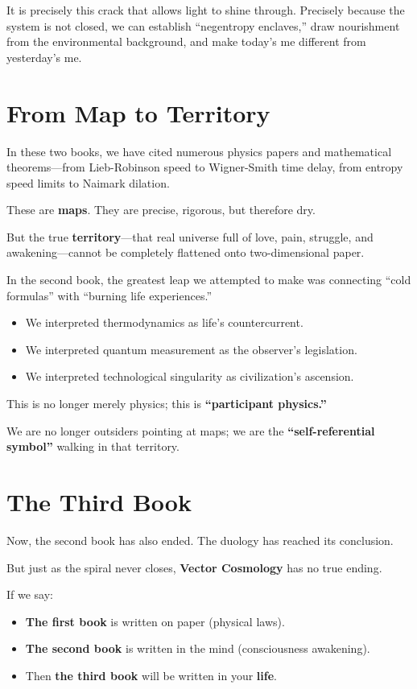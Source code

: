 It is precisely this crack that allows light to shine through. Precisely because the system is not closed, we can establish ``negentropy enclaves,'' draw nourishment from the environmental background, and make today's me different from yesterday's me.

\section{From Map to Territory}

In these two books, we have cited numerous physics papers and mathematical theorems---from Lieb-Robinson speed to Wigner-Smith time delay, from entropy speed limits to Naimark dilation.

These are \textbf{maps}. They are precise, rigorous, but therefore dry.

But the true \textbf{territory}---that real universe full of love, pain, struggle, and awakening---cannot be completely flattened onto two-dimensional paper.

In the second book, the greatest leap we attempted to make was connecting ``cold formulas'' with ``burning life experiences.''

\begin{itemize}
\item We interpreted thermodynamics as life's countercurrent.

\item We interpreted quantum measurement as the observer's legislation.

\item We interpreted technological singularity as civilization's ascension.
\end{itemize}

This is no longer merely physics; this is \textbf{``participant physics.''}

We are no longer outsiders pointing at maps; we are the \textbf{``self-referential symbol''} walking in that territory.

\section{The Third Book}

Now, the second book has also ended. The duology has reached its conclusion.

But just as the spiral never closes, \textbf{Vector Cosmology} has no true ending.

If we say:

\begin{itemize}
\item \textbf{The first book} is written on paper (physical laws).

\item \textbf{The second book} is written in the mind (consciousness awakening).

\item Then \textbf{the third book} will be written in your \textbf{life}.
\end{itemize}

